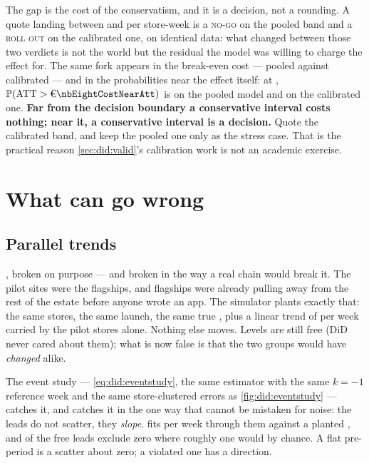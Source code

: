 The gap is the cost of the conservatism, and it is a decision, not a rounding. A quote landing
between \eur{\nbEightCapFull} and \eur{\nbEightCapFullFe} per store-week is a \textsc{no-go} on the
pooled band and a \textsc{roll out} on the calibrated one, on identical data: what changed between
those two verdicts is not the world but the residual the model was willing to charge the effect for.
The same fork appears in the break-even cost --- \eur{\nbEightBreakEven} pooled against
\eur{\nbEightBreakEvenFe} calibrated --- and in the probabilities near the effect itself: at
\eur{\nbEightCostNearAtt}, $\Prob(\text{ATT} > \eur{\nbEightCostNearAtt})$ is \nbEightPPooledNearAtt{}
on the pooled model and \nbEightPFeNearAtt{} on the calibrated one. \textbf{Far from the decision
boundary a conservative interval costs nothing; near it, a conservative interval is a decision.}
Quote the calibrated band, and keep the pooled one only as the stress case. That is the practical
reason \cref{sec:did:valid}'s calibration work is not an academic exercise.

\section{What can go wrong}
\label{sec:did:wrong}

\subsection*{Parallel trends}

, broken on purpose --- and broken in the way a real chain would break it. The pilot
sites were the flagships, and flagships were already pulling away from the rest of the estate before
anyone wrote an app. The simulator plants exactly that: the same \nbEightNStores{} stores, the same
launch, the same true \eur{\nbEightTrueEffect}, plus a linear trend of \eur{\nbEightPtSlope} per week
carried by the pilot stores alone. Nothing else moves. Levels are still free (DiD never cared about
them); what is now false is that the two groups would have \emph{changed} alike.



The event study --- \cref{eq:did:eventstudy}, the same estimator with the same $k = -1$ reference
week and the same store-clustered errors as \cref{fig:did:eventstudy} --- catches it, and catches it
in the one way that cannot be mistaken for noise: the leads do not scatter, they \emph{slope}.
 fits \eur{\nbEightPtSlopeHat} per week through them against a planted
\eur{\nbEightPtSlope}, and \nbEightPtLeadsOut{} of the \nbEightPtNLeads{} free leads exclude zero
where roughly one would by chance. A flat pre-period is a scatter about zero; a violated one has a
direction.

